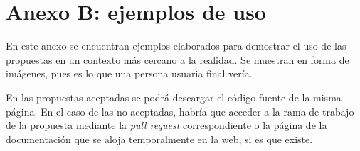 \chapter{Anexo B: ejemplos de uso} \label{chp:anexo_docs_examples}

En este anexo se encuentran ejemplos elaborados para demostrar el uso de las propuestas en un contexto más cercano a la realidad. Se muestran en forma de imágenes, pues es lo que una persona usuaria final vería.

En las propuestas aceptadas se podrá descargar el código fuente de la misma página. En el caso de las no aceptadas, habría que acceder a la rama de trabajo de la propuesta mediante la \textit{pull request} correspondiente o la página de la documentación que se aloja temporalmente en la web, si es que existe.

